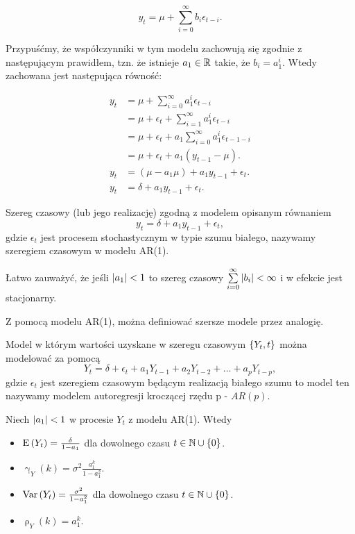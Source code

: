 \documentclass[10pt,a4paper]{book}
\newcommand{\tsAutoCovariance}[3][\gamma]{\operatorname{#1}_{#2} \left({#3}\right)}
\newcommand{\tsAutoCorellation}[3][\rho]{\operatorname{#1}_{#2} \left({#3}\right)}
\begin{document}
$$
y_t = \mu + \sum_{i=0}^{\infty}  b_i \epsilon_{t-i}.
$$

Przypuśćmy, że współczynniki w tym modelu zachowują się zgodnie z następującym prawidłem, tzn. że istnieje $ a_1 \in \mathbb{R}$ takie, że $b_i = a_1^i$. Wtedy zachowana jest następująca równość:

\begin{align*}
y_t &= \mu + \sum_{i=0}^{\infty} a_1^i \epsilon_{t-i} \\
&= \mu + \epsilon_{t} + \sum_{i=1}^{\infty} a_1^{i} \epsilon_{t-i} \\
&= \mu + \epsilon_{t} + a_1 \sum_{i=0}^{\infty} a_1^{i} \epsilon_{t-1-i} \\
&= \mu + \epsilon_{t} + a_1 (y_{t-1} - \mu). \\
y_t &= (\mu - a_1 \mu) + a_1 y_{t-1} + \epsilon_t. \\
y_t &= \delta + a_1 y_{t-1} + \epsilon_t.
\end{align*}

\begin{definition}[Model AR(1)]
Szereg czasowy (lub jego realizację) zgodną z modelem opisanym równaniem
$$
y_t = \delta + a_1 y_{t-1} + \epsilon_t,
$$
gdzie $\epsilon_t$ jest procesem stochastycznym w typie szumu białego, nazywamy szeregiem czasowym w modelu AR(1).
\end{definition}

\begin{proposition}
Łatwo zauważyć, że jeśli ${\left| {a_1} \right|} < 1$ to szereg czasowy $\sum_{i=0}^{\infty} \abs{b_i} < \infty$ i w efekcie jest stacjonarny.
\end{proposition}

Z pomocą modelu AR(1), można definiować szersze modele przez analogię.

\begin{definition} 
Model w którym wartości uzyskane w szeregu czasowym $\left\lbrace {{Y_t}, {t}} \right\rbrace$ można modelować za pomocą
$$
Y_t = \delta + \epsilon_t + a_1 Y_{t-1} + a_2 Y_{t-2} + \ldots + a_p Y_{t-p} ,
$$
gdzie $\epsilon_t $ jest szeregiem czasowym będącym realizacją białego szumu to model ten nazywamy modelem autoregresji kroczącej rzędu p - $AR(p)$.
\end{definition}

\begin{theorem}[Własności AR(1)]
Niech ${\left| {a_1} \right|} < 1$ w procesie $Y_t$ z modelu AR(1). Wtedy
\begin{itemize}
\item $ \operatorname{E} \left({Y_t} \right) = \frac{\delta}{1-a_1} $ dla dowolnego czasu $t \in \mathbb{N} \cup \left\lbrace {0} \right\rbrace $.
\item $ \tsAutoCovariance{Y}{k} = \sigma^2 \frac{a_1^k}{1-a_1^2}$.
\item $ \operatorname{Var} \left( {Y_t} \right) = \frac{\sigma^2}{1-a_1^2}$ dla dowolnego czasu $t \in \mathbb{N} \cup \left\lbrace {0} \right\rbrace $.
\item $ \tsAutoCorellation{Y}{k} = a_1^k$.
\end{itemize}
\end{theorem}
\end{document}
